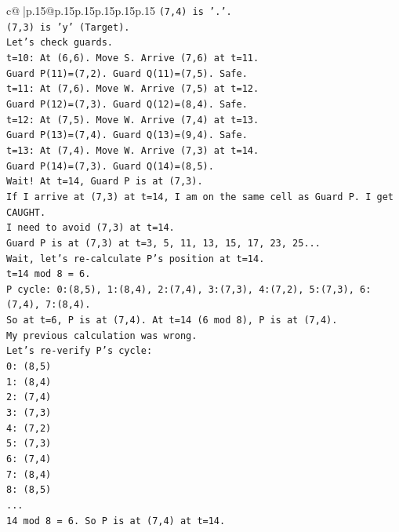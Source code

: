 \documentclass{article}
\begin{document}
{\begin{supertabular}{c@{$\;$}|p{.15\linewidth}@{}p{.15\linewidth}p{.15\linewidth}p{.15\linewidth}p{.15\linewidth}p{.15\linewidth}}
{{{\texttt{(7,4) is '.'.} \\
\texttt{(7,3) is 'y' (Target).} \\
\texttt{Let's check guards.} \\
\texttt{t=10: At (6,6). Move S. Arrive (7,6) at t=11.} \\
\texttt{Guard P(11)=(7,2). Guard Q(11)=(7,5). Safe.} \\
\texttt{t=11: At (7,6). Move W. Arrive (7,5) at t=12.} \\
\texttt{Guard P(12)=(7,3). Guard Q(12)=(8,4). Safe.} \\
\texttt{t=12: At (7,5). Move W. Arrive (7,4) at t=13.} \\
\texttt{Guard P(13)=(7,4). Guard Q(13)=(9,4). Safe.} \\
\texttt{t=13: At (7,4). Move W. Arrive (7,3) at t=14.} \\
\texttt{Guard P(14)=(7,3). Guard Q(14)=(8,5).} \\
\texttt{Wait! At t=14, Guard P is at (7,3).} \\
\texttt{If I arrive at (7,3) at t=14, I am on the same cell as Guard P. I get CAUGHT.} \\
\texttt{I need to avoid (7,3) at t=14.} \\
\texttt{Guard P is at (7,3) at t=3, 5, 11, 13, 15, 17, 23, 25...} \\
\texttt{Wait, let's re{-}calculate P's position at t=14.} \\
\texttt{t=14 mod 8 = 6.} \\
\texttt{P cycle: 0:(8,5), 1:(8,4), 2:(7,4), 3:(7,3), 4:(7,2), 5:(7,3), 6:(7,4), 7:(8,4).} \\
\texttt{So at t=6, P is at (7,4). At t=14 (6 mod 8), P is at (7,4).} \\
\texttt{My previous calculation was wrong.} \\
\texttt{Let's re{-}verify P's cycle:} \\
\texttt{0: (8,5)} \\
\texttt{1: (8,4)} \\
\texttt{2: (7,4)} \\
\texttt{3: (7,3)} \\
\texttt{4: (7,2)} \\
\texttt{5: (7,3)} \\
\texttt{6: (7,4)} \\
\texttt{7: (8,4)} \\
\texttt{8: (8,5)} \\
\texttt{...} \\
\texttt{14 mod 8 = 6. So P is at (7,4) at t=14.} \\
}}}
\end{supertabular}}
\end{document}
